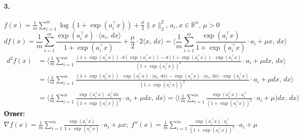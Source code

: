 \documentclass{article}
\newcommand*{\R}{\mathbb{R}}
\begin{document}
\paragraph{3.} $f(x) = \frac{1}{m} \sum\limits_{i = 1}^m \log(1 + \exp(a_i^{\top} x)) + \frac{\mu}{2} \| x \|_2^2, \, a_i, x \in \R^n, \, \mu > 0$
\[ df(x) = \frac{1}{m} \sum\limits_{i = 1}^m \frac{\exp(a_i^{\top} x) \cdot \langle a_i,\, dx \rangle}{1 + \exp(a_i^{\top} x)} + \frac{\mu}{2} \cdot 2\langle x,\, dx \rangle = \bigg\langle \frac{1}{m} \sum\limits_{i = 1}^m \frac{\exp(a_i^{\top} x)}{1 + \exp(a_i^{\top} x)} \cdot a_i + \mu x,\, dx \bigg\rangle \]
\begin{equation*}
\begin{aligned}
    d^2f(x) &= \bigg\langle \frac{1}{m} \sum\limits_{i = 1}^m \frac{\left(1 + \exp(a_i^{\top} x)\right) \cdot d\left(\exp(a_i^{\top} x)\right) - d\left(1 + \exp(a_i^{\top} x)\right) \cdot \exp(a_i^{\top} x)}{\left(1 + \exp(a_i^{\top} x)\right)^2} \cdot a_i + \mu dx,\, dx \bigg\rangle \\
    &= \bigg\langle \frac{1}{m} \sum\limits_{i = 1}^m \frac{\left(1 + \exp(a_i^{\top} x)\right) \cdot \exp(a_i^{\top} x) \cdot \langle a_i,\, dx \rangle - \exp(a_i^{\top} x) \cdot \langle a_i,\, dx \rangle \cdot \exp(a_i^{\top} x)}{\left(1 + \exp(a_i^{\top} x)\right)^2} \cdot a_i + \mu dx,\, dx \bigg\rangle \\
    &= \bigg\langle \frac{1}{m} \sum\limits_{i = 1}^m \frac{\exp(a_i^{\top} x) \cdot a_i^{\top} dx}{\left(1 + \exp(a_i^{\top} x)\right)^2} \cdot a_i + \mu dx,\, dx \bigg\rangle = \bigg\langle \bigg(\frac{1}{m} \sum\limits_{i = 1}^m \frac{\exp(a_i^{\top} x) \cdot a_i^{\top}}{\left(1 + \exp(a_i^{\top} x)\right)^2} \cdot a_i + \mu \bigg) dx,\, dx \bigg\rangle
\end{aligned}
\end{equation*}
\textbf{Ответ:} $\nabla f(x) = \frac{1}{m} \sum\limits_{i = 1}^m \frac{\exp(a_i^{\top} x)}{1 + \exp(a_i^{\top} x)} \cdot a_i + \mu x;\; f''(x) = \frac{1}{m} \sum\limits_{i = 1}^m \frac{\exp(a_i^{\top} x) \cdot a_i^{\top}}{\left(1 + \exp(a_i^{\top} x)\right)^2} \cdot a_i + \mu$
\end{document}

